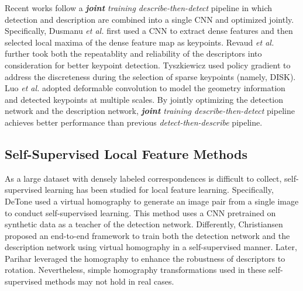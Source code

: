 \documentclass[10pt,twocolumn,letterpaper]{article}
\begin{document}
Recent works \cite{Dusmanu2019CVPR, revaud2019r2d2, luo2020aslfeat, tyszkiewiczDISKLearningLocal2020a} follow a \textit{\textbf{joint} training describe-then-detect} pipeline in which detection and description are combined into a single CNN and optimized jointly.
Specifically, Dusmanu \emph{et al.} \cite{Dusmanu2019CVPR} first used a CNN to extract dense features and then selected local maxima of the dense feature map as keypoints. Revaud \emph{et al.} \cite{revaud2019r2d2} further took  both the repeatablity and reliability of the descriptors into consideration for better keypoint detection. Tyszkiewicz \etal \cite{tyszkiewiczDISKLearningLocal2020a} used policy gradient to address the  discreteness during the selection of sparse keypoints (namely, DISK). Luo \emph{et al.} \cite{luo2020aslfeat} adopted deformable convolution to model the geometry information and detected keypoints at multiple scales.
By jointly optimizing the detection network and the description network, \textit{\textbf{joint} training describe-then-detect} pipeline achieves better performance than previous \textit{detect-then-describe} pipeline.


\subsection{Self-Supervised Local Feature Methods}
As a large dataset with densely labeled correspondences is difficult to collect, self-supervised learning has been studied for local feature learning. 
Specifically, DeTone \etal \cite{detone2018superpoint} used a virtual homography to generate an image pair from a single image to conduct self-supervised learning. 
This method uses a CNN pretrained on synthetic data as a teacher of the detection network. Differently, Christiansen \etal \cite{christiansen2019unsuperpoint}  proposed an end-to-end framework to train both the detection network and the description network using virtual homography in a self-supervised manner.
Later, Parihar \etal \cite{parihar2021rord}  leveraged the homography to enhance the robustness of descriptors to rotation.
Nevertheless, simple homography transformations used in these self-supervised methods may not hold in real cases. 
\end{document}
